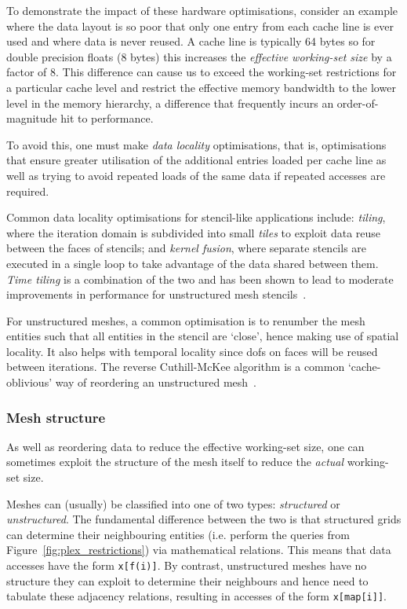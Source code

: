 To demonstrate the impact of these hardware optimisations, consider an example where the data layout is so poor that only one entry from each cache line is ever used and where data is never reused.
A cache line is typically 64 bytes so for double precision floats (8 bytes) this increases the \textit{effective working-set size} by a factor of 8.
This difference can cause us to exceed the working-set restrictions for a particular cache level and restrict the effective memory bandwidth to the lower level in the memory hierarchy, a difference that frequently incurs an order-of-magnitude hit to performance.

To avoid this, one must make \textit{data locality} optimisations, that is, optimisations that ensure greater utilisation of the additional entries loaded per cache line as well as trying to avoid repeated loads of the same data if repeated accesses are required.

Common data locality optimisations for stencil-like applications include: \textit{tiling}, where the iteration domain is subdivided into small \textit{tiles} to exploit data reuse between the faces of stencils; and \textit{kernel fusion}, where separate stencils are executed in a single loop to take advantage of the data shared between them.  %
\textit{Time tiling} is a combination of the two and has been shown to lead to moderate improvements in performance for unstructured mesh stencils~\cite{luporiniAutomatedTilingUnstructured2019}.

For unstructured meshes, a common optimisation is to renumber the mesh entities such that all entities in the stencil are `close', hence making use of spatial locality.
It also helps with temporal locality since \glspl{dof} on faces will be reused between iterations.
The reverse Cuthill-McKee algorithm is a common `cache-oblivious' way of reordering an unstructured mesh~\cite{cuthillReducingBandwidthSparse1969,langeEfficientMeshManagement2016}.

\subsubsection{Mesh structure}

As well as reordering data to reduce the effective working-set size, one can sometimes exploit the structure of the mesh itself to reduce the \textit{actual} working-set size.

Meshes can (usually) be classified into one of two types: \textit{structured} or \textit{unstructured}.
The fundamental difference between the two is that structured grids can determine their neighbouring entities (i.e. perform the queries from Figure~\ref{fig:plex_restrictions}) via mathematical relations.
This means that data accesses have the form \texttt{x[f(i)]}.
By contrast, unstructured meshes have no structure they can exploit to determine their neighbours and hence need to tabulate these adjacency relations, resulting in accesses of the form \texttt{x[map[i]]}.


